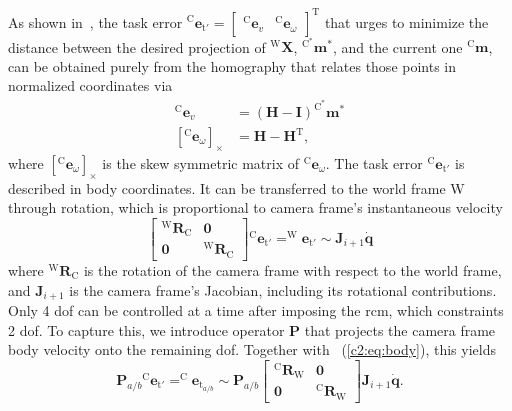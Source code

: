 As shown in~\cite{benhimane2006homography}, the task error $^\text{C}\mathbf{e}_{\text{t}'} = \begin{bmatrix}^\text{C}\mathbf{e}_v & ^\text{C}\mathbf{e}_\omega\end{bmatrix}^\text{T}$ that urges to minimize the distance between the desired projection of $^\text{W}\mathbf{X}$, $^{\text{C}^*}\mathbf{m}^*$, and the current one $^\text{C}\mathbf{m}$, can be obtained purely from the homography that relates those points in normalized coordinates via
\begin{equation}
    \begin{split}
        ^\text{C}\mathbf{e}_v & = (\mathbf{H} - \mathbf{I})^{\text{C}^*}\mathbf{m}^*\\
        \left[^\text{C}\mathbf{e}_\omega\right]_\times & = \mathbf{H} - \mathbf{H}^\text{T},
    \end{split}
    \label{c2:eq:dc}
\end{equation}
where $\left[^\text{C}\mathbf{e}_\omega\right]_\times$ is the skew symmetric matrix of $^\text{C}\mathbf{e}_\omega$. The task error $^\text{C}\mathbf{e}_{\text{t}'}$ is described in body coordinates. It can be transferred to the world frame W through rotation, which is proportional to camera frame's instantaneous velocity
\begin{equation}
    \begin{bmatrix}^\text{W}\mathbf{R}_\text{C} & \mathbf{0} \\ \mathbf{0} & ^\text{W}\mathbf{R}_\text{C}\end{bmatrix}{^\text{C}\mathbf{e}_{\text{t}'}} = ^\text{W}\mathbf{e}_{\text{t}'} \sim \mathbf{J}_{i+1}\dot{\mathbf{q}}
    \label{c2:eq:body}
\end{equation}
where $^\text{W}\mathbf{R}_\text{C}$ is the rotation of the camera frame with respect to the world frame, and $\mathbf{J}_{i+1}$ is the camera frame's Jacobian, including its rotational contributions. Only 4 \gls{dof} can be controlled at a time after imposing the \gls{rcm}, which constraints 2 \gls{dof}. To capture this, we introduce operator $\mathbf{P}$ that projects the camera frame body velocity onto the remaining \gls{dof}. Together with \ (\eqref{c2:eq:body}), this yields
\begin{equation}
    \mathbf{P}_{a/b}{^\text{C}\mathbf{e}_{\text{t}'}} = ^\text{C}\mathbf{e}_{\text{t}_{a/b}} \sim \mathbf{P}_{a/b} \begin{bmatrix}^\text{C}\mathbf{R}_\text{W} & \mathbf{0} \\ \mathbf{0} & ^\text{C}\mathbf{R}_\text{W}\end{bmatrix}\mathbf{J}_{i+1}\dot{\mathbf{q}}.
    \label{c2:eq:proj}
\end{equation}
